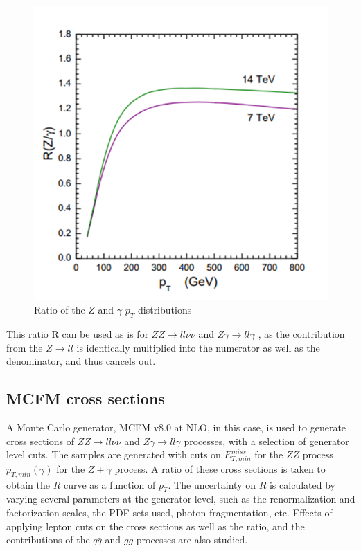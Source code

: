 \documentclass[11pt,a4paper,final]{report}
\newcommand{\ZZ}{$ZZ\rightarrow ll\nu\nu$ }
\newcommand{\Zgam}{$Z\gamma\rightarrow ll\gamma$ }
\begin{document}
\begin{figure}[H]
	\centering
		\includegraphics[scale=0.5]{paper_Rplot.png}
		\caption{Ratio of the $Z$ and $\gamma$ $p_T$ distributions \cite{gammajet}}
\end{figure}
This ratio R can be used as is for \ZZ and \Zgam, as the contribution from the $Z\rightarrow ll$ is identically multiplied into the numerator as well as the denominator, and thus cancels out.

\subsection*{MCFM cross sections}
A Monte Carlo generator, MCFM v8.0 \cite{MCFM} at NLO, in this case, is used to generate cross sections of \ZZ and \Zgam processes, with a selection of generator level cuts. The samples are generated with cuts on $E_{T,min}^{miss}$ for the $ZZ$ process $p_{T,min}(\gamma)$ for the $Z+\gamma$ process. A ratio of these cross sections is taken to obtain the $R$ curve as a function of $p_T$. The uncertainty on $R$ is calculated by varying several parameters at the generator level, such as the renormalization and factorization scales, the PDF sets used, photon fragmentation, etc. Effects of applying lepton cuts on the cross sections as well as the ratio, and the contributions of the $q \bar{q}$ and $gg$ processes are also studied.
\end{document}
